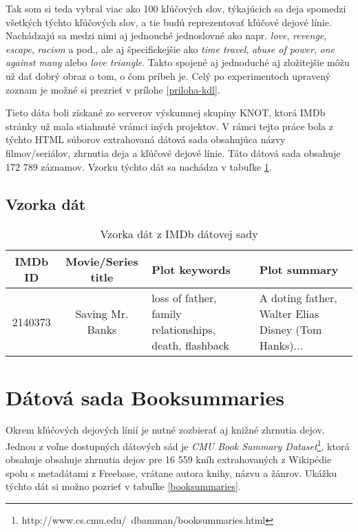 Tak som si teda vybral viac ako 100 kľúčových slov, týkajúcich sa deja spomedzi všetkých týchto kľúčových slov, a tie budú reprezentovať kľúčové dejové línie. Nachádzajú sa medzi nimi aj jednouché jednoslovné ako napr. \textit{love}, \textit{revenge}, \textit{escape}, \textit{racism} a pod., ale aj špecifickejšie ako \textit{time travel}, \textit{abuse of power}, \textit{one against many} alebo \textit{love triangle}. Takto spojené aj jednoduché aj zložitejšie môžu už dať dobrý obraz o tom, o čom príbeh je. Celý po experimentoch upravený zoznam je možné si prezrieť v prílohe \ref{priloha-kdl}. 

Tieto dáta boli získané zo serverov výskumnej skupiny KNOT, ktorá IMDb stránky už mala stiahnuté vrámci iných projektov. V rámci tejto práce bola z týchto HTML súborov extrahovaná dátová sada obsahujúca názvy filmov/seriálov, zhrnutia deja a kľúčové dejové línie. Táto dátová sada obsahuje 172 789 záznamov. Vzorku týchto dát sa nachádza v tabuľke \ref{imdb}.

\subsection*{Vzorka dát}

\begin{table}[hbt]
\centering
\caption{Vzorka dát z IMDb dátovej sady}
\label{imdb}
\begin{tabular}{|c|c|
>{\centering\arraybackslash}m{7em}|
>{\centering\arraybackslash}m{7em}|}
\hline
IMDb ID & Movie/Series title & Plot keywords & Plot summary \\
\hline
2140373 & Saving Mr. Banks & loss of father, family relationships, death, flashback &  A doting father, Walter Elias Disney (Tom Hanks)...\\ 
\hline

\end{tabular}
\end{table}

\section{Dátová sada Booksummaries}
Okrem kľúčových dejových línií je nutné zozbierať aj knižné zhrnutia dejov. Jednou z voľne dostupných dátových sád je \textit{CMU Book Summary Dataset}\footnote{http://www.cs.cmu.edu/~dbamman/booksummaries.html}, ktorá obsahuje obsahuje zhrnutia dejov pre 16 559 kníh extrahovaných z Wikipédie spolu s metadátami z Freebase, vrátane autora knihy, názvu a žánrov. Ukážku týchto dát si možno pozrieť v tabuľke \ref{booksummaries}.


